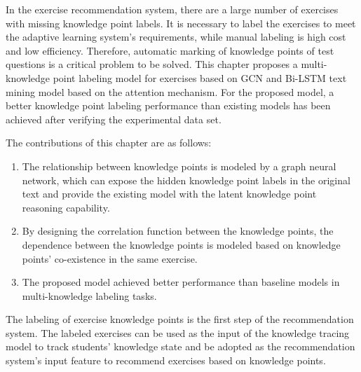 
In the exercise recommendation system, there are a large number of exercises with missing knowledge point labels. It is necessary to label the exercises to meet the adaptive learning system's requirements, while manual labeling is high cost and low efficiency. Therefore, automatic marking of knowledge points of test questions is a critical problem to be solved. This chapter proposes a multi-knowledge point labeling model for exercises based on GCN and Bi-LSTM text mining model based on the attention mechanism. For the proposed model, a better knowledge point labeling performance than existing models has been achieved after verifying the experimental data set.

The contributions of this chapter are as follows:
\begin{enumerate}
    \item The relationship between knowledge points is modeled by a graph neural network, which can expose the hidden knowledge point labels in the original text and provide the existing model with the latent knowledge point reasoning capability.
    \item By designing the correlation function between the knowledge points, the dependence between the knowledge points is modeled based on knowledge points' co-existence in the same exercise.
    \item The proposed model achieved better performance than baseline models in multi-knowledge labeling tasks.
\end{enumerate}

The labeling of exercise knowledge points is the first step of the recommendation system. The labeled exercises can be used as the input of the knowledge tracing model to track students' knowledge state and be adopted as the recommendation system's input feature to recommend exercises based on knowledge points.

